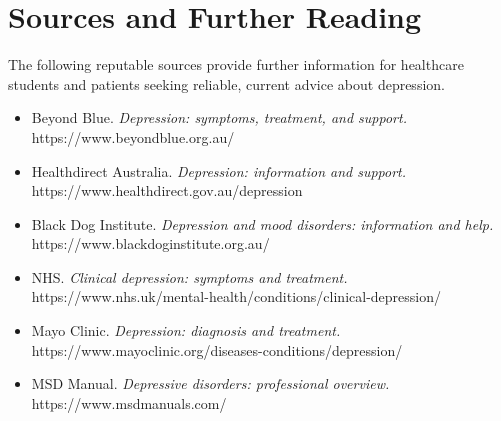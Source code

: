\section*{Sources and Further Reading}
The following reputable sources provide further information for healthcare students and patients seeking reliable, current advice about depression.

\begin{itemize}
    \item Beyond Blue. \textit{Depression: symptoms, treatment, and support.} https://www.beyondblue.org.au/
    \item Healthdirect Australia. \textit{Depression: information and support.} https://www.healthdirect.gov.au/depression
    \item Black Dog Institute. \textit{Depression and mood disorders: information and help.} https://www.blackdoginstitute.org.au/
    \item NHS. \textit{Clinical depression: symptoms and treatment.} https://www.nhs.uk/mental-health/conditions/clinical-depression/
    \item Mayo Clinic. \textit{Depression: diagnosis and treatment.} https://www.mayoclinic.org/diseases-conditions/depression/
    \item MSD Manual. \textit{Depressive disorders: professional overview.} https://www.msdmanuals.com/
\end{itemize}
